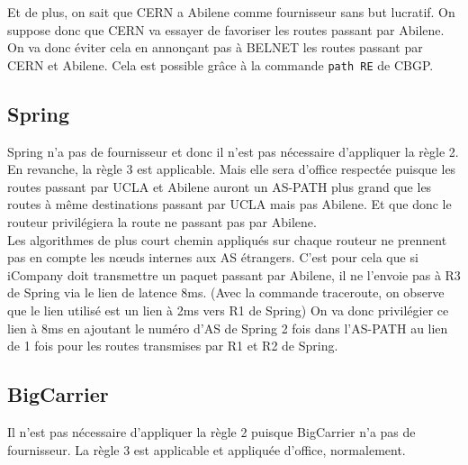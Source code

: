 \documentclass[a4paper, 12pt]{article}
\begin{document}
Et de plus, on sait que CERN a Abilene comme fournisseur sans but lucratif. %
On suppose donc que CERN va essayer de favoriser les routes passant par Abilene.
On va donc éviter cela en annonçant pas à BELNET les routes passant par CERN et Abilene.
Cela est possible grâce à la commande \texttt{path RE} de CBGP.

\subsection{Spring} %
Spring n'a pas de fournisseur et donc il n'est pas nécessaire d'appliquer la règle 2.
\\

En revanche, la règle 3 est applicable.
Mais elle sera d'office respectée puisque les routes passant par UCLA et Abilene auront un AS-PATH plus grand que les routes à même destinations passant par UCLA mais pas Abilene.
Et que donc le routeur privilégiera la route ne passant pas par Abilene.
\\

Les algorithmes de plus court chemin appliqués sur chaque routeur ne prennent pas en compte les nœuds internes aux AS étrangers.
C'est pour cela que si iCompany doit transmettre un paquet passant par Abilene, il ne l'envoie pas à R3 de Spring via le lien de latence 8ms.
(Avec la commande traceroute, on observe que le lien utilisé est un lien à 2ms vers R1 de Spring)
On va donc privilégier ce lien à 8ms en ajoutant le numéro d'AS de Spring 2 fois dans l'AS-PATH au lien de 1 fois pour les routes transmises par R1 et R2 de Spring.

\subsection{BigCarrier}%
Il n'est pas nécessaire d'appliquer la règle 2 puisque BigCarrier n'a pas de fournisseur.
La règle 3 est applicable et appliquée d'office, normalement.
\end{document}
